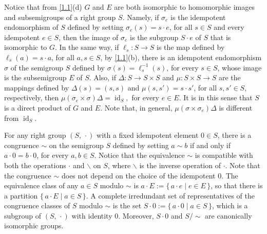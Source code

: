 \documentclass[11pt]{amsart}
\newcommand{\id}{\operatorname{id}}
\theoremstyle{definition}
\begin{document}
\smallskip

Notice that from
\cref{1.1}(d)
$G$ and $E$ are both isomorphic to homomorphic images and subsemigroups of a right group $S$. Namely, if $\sigma_e$ is the idempotent endomorphism of $S$ defined by setting $\sigma_e(s) = s \cdot e$, for all $s \in S$ and every idempotent $e \in S$, then the image of $\sigma_e$ is the subgroup $S \cdot e$ of $S$ that is isomorphic to $G$.
In the same way, if $\ell_s:S\to S$ is the map defined by $\ell_s(a) = s\cdot a$, for all $a,s\in S$, by \cref{1.1}(b), there is an idempotent endomorphism $\sigma$ of the semigroup $S$ defined by %
$\sigma(s)=\ell_s^{-1}(s)$, for every $s\in S$, whose image is the subsemigroup $E$ of $S$.  %
Also, if $\Delta\colon S\to S\times S$ and $\mu\colon S\times S\to S$ are the mappings defined by $\Delta(s) = (s,s)$ and $\mu(s,s')=s\cdot s'$, for all $s,s'\in S$, respectively, then 
$
\mu(\sigma_e\times\sigma)\Delta=\id_S,
$ 
for every $e\in E$. It is in this sense that $S$ is a direct product of $G$ and $E$. Note that, in general,  $\mu(\sigma\times\sigma_e)\Delta$ is different from $\id_S$.


\medskip



For any right group $(S,\,\cdot)$ with a fixed idempotent element $0\in S$, there is a congruence $\sim$ on the semigroup $S$ defined by setting $a\sim b$ if and only if $a\cdot 0=b\cdot 0$, for every $a,b\in S$. Notice that the equivalence $\sim$ is compatible with both the operations $\cdot$ and $\backslash$ on $S$, where $\backslash$ is the inverse operation of $\cdot$. 
Note that the congruence $\sim$ does not depend on the choice of the idempotent $0$.
The equivalence class of any $a\in S$ modulo $\sim$ is $a\cdot E:=\{\,a\cdot e\mid e\in E\,\}$, so that there is a partition $\{\,a\cdot E\mid a\in S\,\}$. A complete irredundant set of representatives of the congruence classes of $S$ modulo $\sim$ is the set $S\cdot 0:=\{\,a\cdot 0\mid a\in S\,\}$, which is a subgroup of $(S,\,\cdot)$ with identity $0$. Moreover, $S\cdot 0$ and $S/{\sim}$ are canonically isomorphic groups.
\end{document}
